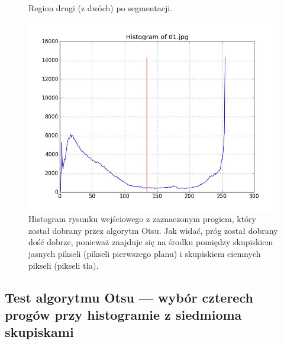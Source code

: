 \documentclass[10pt]{llncs}
\begin{document}
\begin{figure}[!htb]
  \caption{Region drugi (z dwóch) po segmentacji.}\label{fig:3}
\endminipage
\end{figure}

\FloatBarrier

\begin{figure}[h!]
  \centering
  \includegraphics[scale=.3, clip]{img/01_histogram.jpg}
	\caption[]
  {Histogram rysunku wejściowego z zaznaczonym progiem, który został dobrany przez algorytm Otsu. Jak widać, próg został dobrany dość dobrze, ponieważ znajduje się na środku pomiędzy skupiskiem jasnych pikseli (pikseli pierwszego planu) i skupiskiem ciemnych pikseli (pikseli tła).}
\end{figure}

\FloatBarrier

\subsection{Test algorytmu Otsu --- wybór czterech progów przy histogramie z siedmioma skupiskami}
\end{document}
